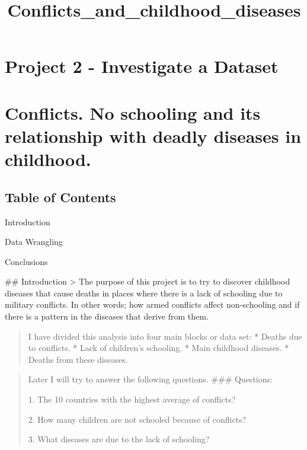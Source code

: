 \documentclass[11pt]{article}
\title{Conflicts\_and\_childhood\_diseases}
\begin{document}
    
    
    \maketitle
    
    

    
    \hypertarget{project-2---investigate-a-dataset}{%
\section{Project 2 - Investigate a
Dataset}\label{project-2---investigate-a-dataset}}

\hypertarget{conflicts.-no-schooling-and-its-relationship-with-deadly-diseases-in-childhood.}{%
\section{Conflicts. No schooling and its relationship with deadly
diseases in
childhood.}\label{conflicts.-no-schooling-and-its-relationship-with-deadly-diseases-in-childhood.}}

    \hypertarget{table-of-contents}{%
\subsection{Table of Contents}\label{table-of-contents}}

Introduction

Data Wrangling

Conclusions

     \#\# Introduction \textgreater{} The purpose of this project is to try
to discover childhood diseases that cause deaths in places where there
is a lack of schooling due to military conflicts. In other words; how
armed conflicts affect non-schooling and if there is a pattern in the
diseases that derive from them.

\begin{quote}
I have divided this analysis into four main blocks or data set: * Deaths
due to conflicts. * Lack of children's schooling. * Main childhood
diseases. * Deaths from these diseases.
\end{quote}

\begin{quote}
Later I will try to answer the following questions. \#\#\# Questions:

1. The 10 countries with the highest average of conflicts?

2. How many children are not schooled because of conflicts?

3. What diseases are due to the lack of schooling?
\end{quote}
\end{document}
